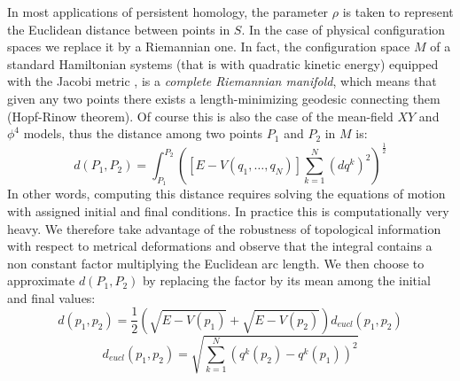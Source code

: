 \documentclass[preprintnumbers,showpacs, showkeys, twocolumn,secnumarabic,amssymb,amsmath,amsfonts,aps, pre]{revtex4-1}
\begin{document}
In most applications of persistent homology, the parameter $\rho $ is taken to represent the Euclidean distance between points in $S$. 
In the case of physical configuration spaces we replace it by a Riemannian one.
In fact, the configuration space $M$ of a standard Hamiltonian systems (that is with quadratic kinetic energy)   equipped with the Jacobi metric \cite{PettiniBook}, is a \textit{complete Riemannian manifold}, which means that given any two points there exists a length-minimizing geodesic connecting them (Hopf-Rinow theorem).
Of course this is also the case of the mean-field  $XY$ and $\phi^4$ models, 
thus the distance among two points $P_1$ and $P_2$ in $M$ is:
\begin{equation}
d(P_1,P_2)=\int_{P_1}^{P_2} \left( [E-V(q_1,\ldots,q_N)] \sum_{k=1}^N (dq^k)^2\right )^{\frac{1}{2}}
\end{equation}
In other words, computing this distance requires solving the equations of motion with assigned initial and final conditions. In practice this is computationally very heavy. 
We therefore take advantage of the robustness of topological information with respect to metrical deformations and observe that the integral contains a non constant factor multiplying the Euclidean arc length. 
We then choose to approximate $d(P_1,P_2)$ by replacing the factor by its mean among the initial and final values:
\begin{equation}\label{distance}
d(p_1,p_2)=\frac{1}{2} ( \sqrt{E-V(p_1)} + \sqrt{E-V(p_2)} ) d_{\textit{eucl}}(p_1,p_2)
\end{equation}
\begin{equation}
d_{\textit{eucl}}(p_1,p_2)=\sqrt{\sum_{k=1}^N (q^k(p_2)-q^k(p_1))^2 }
\end{equation}
\end{document}
